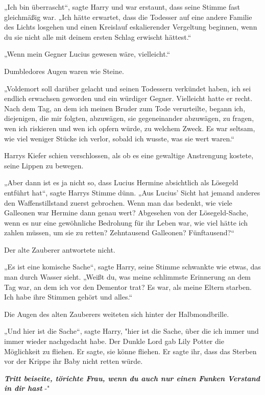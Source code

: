 {„Ich bin überrascht“, sagte Harry und war erstaunt, dass seine Stimme fast gleichmäßig war. „Ich hätte erwartet, dass die Todesser auf eine andere Familie des Lichts losgehen und einen Kreislauf eskalierender Vergeltung beginnen, wenn du sie nicht alle mit deinem ersten Schlag erwischt hättest.“

„Wenn mein Gegner Lucius gewesen wäre, vielleicht.“

Dumbledores Augen waren wie Steine.

„Voldemort soll darüber gelacht und seinen Todessern verkündet haben, ich sei endlich erwachsen geworden und ein würdiger Gegner. Vielleicht hatte er recht. Nach dem Tag, an dem ich meinen Bruder zum Tode verurteilte, begann ich, diejenigen, die mir folgten, abzuwägen, sie gegeneinander abzuwägen, zu fragen, wen ich riskieren und wen ich opfern würde, zu welchem Zweck. Es war seltsam, wie viel weniger Stücke ich verlor, sobald ich wusste, was sie wert waren.“

Harrys Kiefer schien verschlossen, als ob es eine gewaltige Anstrengung kostete, seine Lippen zu bewegen.

„Aber dann ist es ja nicht so, dass Lucius Hermine absichtlich als Lösegeld entführt hat“, sagte Harrys Stimme dünn. „Aus Lucius' Sicht hat jemand anderes den Waffenstillstand zuerst gebrochen. Wenn man das bedenkt, wie viele Galleonen war Hermine dann genau wert? Abgesehen von der Lösegeld-Sache, wenn es nur eine gewöhnliche Bedrohung für ihr Leben war, wie viel hätte ich zahlen müssen, um sie zu retten? Zehntausend Galleonen? Fünftausend?“

Der alte Zauberer antwortete nicht.

„Es ist eine komische Sache“, sagte Harry, seine Stimme schwankte wie etwas, das man durch Wasser sieht. „Weißt du, was meine schlimmste Erinnerung an dem Tag war, an dem ich vor den Dementor trat? Es war, als meine Eltern starben. Ich habe ihre Stimmen gehört und alles.“

Die Augen des alten Zauberers weiteten sich hinter der Halbmondbrille.

„Und hier ist die Sache“, sagte Harry, "hier ist die Sache, über die ich immer und immer wieder nachgedacht habe. Der Dunkle Lord gab Lily Potter die Möglichkeit zu fliehen. Er sagte, sie könne fliehen. Er sagte ihr, dass das Sterben vor der Krippe ihr Baby nicht retten würde.

\textbf{\emph{Tritt beiseite, törichte Frau, wenn du auch nur einen Funken Verstand in dir hast}} -"

}
